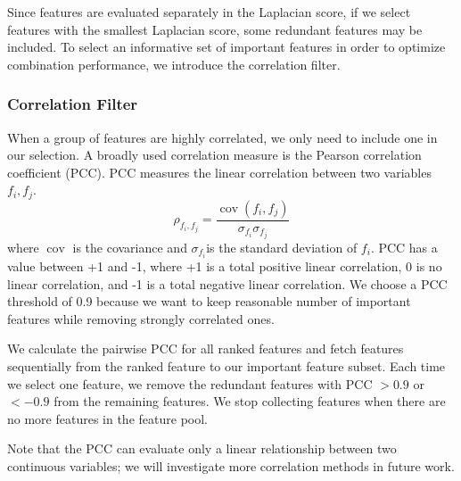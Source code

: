 Since features are evaluated separately in the Laplacian score, if we select features with the smallest Laplacian score, some redundant features may be included. To select an informative set of important features in order to optimize combination performance, we introduce the correlation filter.

\subsubsection{Correlation Filter}
When a group of features are highly correlated, we only need to include one in our selection. A broadly used correlation measure is the Pearson correlation coefficient (PCC). PCC measures the linear correlation between two variables $f_{i}, f_{j}$. 
\begin{equation}
\rho_{f_{i}, f_{j}}=\frac{\operatorname{cov}(f_{i}, f_{j})}{\sigma_{f_{i}} \sigma_{f_{j}}}
\end{equation}
where $\operatorname{cov}$ is the covariance and $\sigma_{f_{i}}$is the standard deviation of $f_{i}$.
PCC has a value between +1 and -1, where +1 is a total positive linear correlation, 0 is no linear correlation, and -1 is a total negative linear correlation. We choose a PCC threshold of 0.9 because we want to keep reasonable number of important features while removing strongly correlated ones.  

We calculate the pairwise PCC for all ranked features and fetch features sequentially from the ranked feature to our important feature subset. Each time we select one feature, we remove the redundant features with PCC $> 0.9$ or $< -0.9$ from the remaining features. We stop collecting features when there are no more features in the feature pool. %

Note that the PCC can evaluate only a linear relationship between two continuous variables; we will investigate more correlation methods in future work.